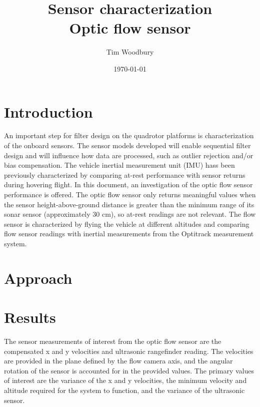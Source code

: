 \documentclass{article}
\title{Sensor characterization \\ \large{Optic flow sensor}}
\author{Tim Woodbury}
\date{\today} %
\begin{document}
\maketitle

\section{Introduction}

An important step for filter design on the quadrotor platforms is characterization of the onboard sensors. The sensor models developed will enable sequential filter design and will influence how data are processed, such as outlier rejection and/or bias compensation. The vehicle inertial measurement unit (IMU) hass been previously characterized by comparing at-rest performance with sensor returns during hovering flight. In this document, an investigation of the optic flow sensor performance is offered. The optic flow sensor only returns meaningful values when the sensor height-above-ground distance is greater than the minimum range of its sonar sensor (approximately 30 cm), so at-rest readings are not relevant. The flow sensor is characterized by flying the vehicle at different altitudes and comparing flow sensor readings with inertial measurements from the Optitrack measurement system.

\section{Approach}


\section{Results}

The sensor measurements of interest from the optic flow sensor are the compensated x and y velocities and ultrasonic rangefinder reading. The velocities are provided in the plane defined by the flow camera axis, and the angular rotation of the sensor is accounted for in the provided values. The primary values of interest are the variance of the x and y velocities, the minimum velocity and altitude required for the system to function, and the variance of the ultrasonic sensor.
\end{document}
